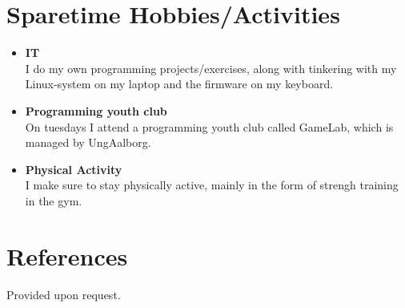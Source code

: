 \documentclass{article}
\begin{document}
    \section*{Sparetime Hobbies/Activities}
    \begin{itemize}\setlength\itemsep{0.5em}
        \item[] \textbf{IT}\\
            I do my own programming projects/exercises, along with tinkering
            with my Linux-system on my laptop and the firmware on my keyboard.
        \item[] \textbf{Programming youth club}\\
            On tuesdays I attend a programming youth club called GameLab, which is managed by
            UngAalborg.
        \item[] \textbf{Physical Activity}\\
            I make sure to stay physically active, mainly in the form of strengh training in the
            gym.
    \end{itemize}

    \section*{References}
    Provided upon request.
\end{document}
